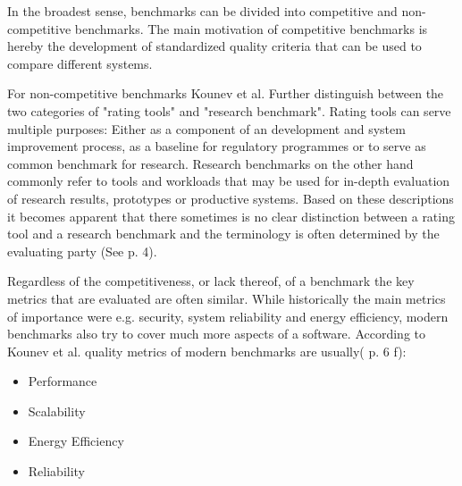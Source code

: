 \documentclass[	runningheads,
				a4paper]{llncs}
\begin{document}
In the broadest sense, benchmarks can be divided into competitive and non-competitive benchmarks. The main motivation of competitive benchmarks is hereby the development of standardized quality criteria that can be used to compare different systems.

For non-competitive benchmarks Kounev et al. Further distinguish between the two categories of "rating tools" and "research benchmark". Rating tools can serve multiple purposes: Either as a component of an development and system improvement process, as a baseline for regulatory programmes or to serve as common benchmark for research. Research benchmarks on the other hand commonly refer to tools and workloads that may be used for in-depth evaluation of research results, prototypes or productive systems. Based on these descriptions it becomes apparent that there sometimes is no clear distinction between a rating tool and a research benchmark and the terminology is often determined by the evaluating party (See \cite{Kounev} p. 4).

Regardless of the competitiveness, or lack thereof, of a benchmark the key metrics that are evaluated are often similar. While historically the main metrics of importance were e.g. security, system reliability and energy efficiency, modern benchmarks also try to cover much more aspects of a software. According to Kounev et al. quality metrics of modern benchmarks are usually(\cite{Kounev} p. 6 f):
\begin{itemize}
	\item Performance
	\item Scalability
	\item	Energy Efficiency
	\item Reliability
\end{itemize}


\end{document}
